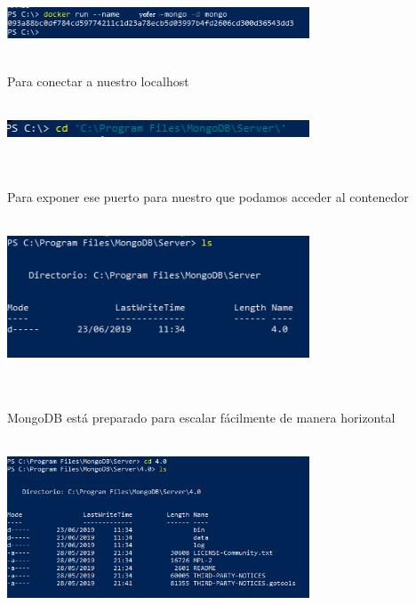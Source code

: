 \documentclass[twoside,onecolumn]{article}
\begin{document}
\begin{flushright}
\begin{itemize}
\textbf{}\\
\textbf{}\\
\begin{center}
		\includegraphics[width=9cm]{./Imagenes/5d}
		\end{center}	
\textbf{}\\
Para conectar a nuestro localhost
\textbf{}\\
\textbf{}\\
\begin{center}
		\includegraphics[width=9cm]{./Imagenes/6d}
		\end{center}	
\textbf{}\\
\textbf{}\\
Para exponer ese puerto para nuestro que podamos
acceder al contenedor
\textbf{}\\
\textbf{}\\
\begin{center}
		\includegraphics[width=9cm]{./Imagenes/7d}
		\end{center}	
\textbf{}\\
\textbf{}\\
MongoDB está preparado para escalar fácilmente
de manera horizontal
\textbf{}\\
\textbf{}\\
\begin{center}
		\includegraphics[width=9cm]{./Imagenes/8d}
		\end{center}	
\textbf{}\\

\end{itemize}
\end{flushright}
\end{document}
